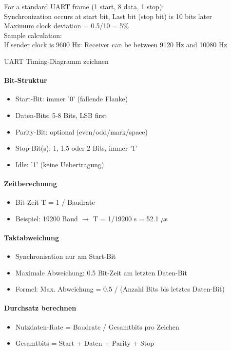 \begin{example}
    For a standard UART frame (1 start, 8 data, 1 stop):\\
    Synchronization occurs at start bit,
    Last bit (stop bit) is 10 bits later\\
    Maximum clock deviation = 0.5/10 = 5\%\\
    Sample calculation:\\
    If sender clock is 9600 Hz: Receiver can be between 9120 Hz and 10080 Hz
\end{example}

\multend

\begin{KR}{UART Timing-Diagramm zeichnen}
    \paragraph{Bit-Struktur}
    \begin{itemize}
        \item Start-Bit: immer '0' (fallende Flanke)
        \item Daten-Bits: 5-8 Bits, LSB first
        \item Parity-Bit: optional (even/odd/mark/space)
        \item Stop-Bit(s): 1, 1.5 oder 2 Bits, immer '1'
        \item Idle: '1' (keine Uebertragung)
    \end{itemize}
    
    \paragraph{Zeitberechnung}
    \begin{itemize}
        \item Bit-Zeit T = 1 / Baudrate
        \item Beispiel: 19200 Baud $\rightarrow$ T = 1/19200 s = 52.1 $\mu$s
    \end{itemize}
    
    \paragraph{Taktabweichung}
    \begin{itemize}
        \item Synchronisation nur am Start-Bit
        \item Maximale Abweichung: 0.5 Bit-Zeit am letzten Daten-Bit
        \item Formel: Max. Abweichung = 0.5 / (Anzahl Bits bis letztes Daten-Bit)
    \end{itemize}
    
    \paragraph{Durchsatz berechnen}
    \begin{itemize}
        \item Nutzdaten-Rate = Baudrate / Gesamtbits pro Zeichen
        \item Gesamtbits = Start + Daten + Parity + Stop
    \end{itemize}
\end{KR}

